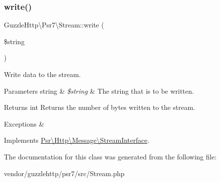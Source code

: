 \subsubsection{\texorpdfstring{write()}{write()}}
{\footnotesize\ttfamily Guzzle\+Http\textbackslash{}\+Psr7\textbackslash{}\+Stream\+::write (\begin{DoxyParamCaption}\item[{}]{\$string }\end{DoxyParamCaption})}

Write data to the stream.


\begin{DoxyParams}[1]{Parameters}
string & {\em \$string} & The string that is to be written. \\
\hline
\end{DoxyParams}
\begin{DoxyReturn}{Returns}
int Returns the number of bytes written to the stream. 
\end{DoxyReturn}

\begin{DoxyExceptions}{Exceptions}
{\em } & \\
\hline
\end{DoxyExceptions}


Implements \hyperlink{interfacePsr_1_1Http_1_1Message_1_1StreamInterface_aabf9fe3e09f85753834cdb69bbdf3c3d}{Psr\textbackslash{}\+Http\textbackslash{}\+Message\textbackslash{}\+Stream\+Interface}.



The documentation for this class was generated from the following file\+:\begin{DoxyCompactItemize}
\item 
vendor/guzzlehttp/psr7/src/Stream.\+php\end{DoxyCompactItemize}
